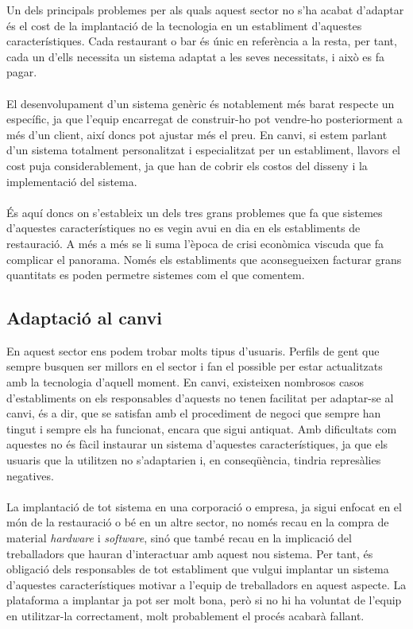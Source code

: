 Un dels principals problemes per als quals aquest sector no s'ha acabat d'adaptar és el cost de la implantació de la tecnologia en un establiment d'aquestes característiques. Cada restaurant o bar és únic en referència a la resta, per tant, cada un d'ells necessita un sistema adaptat a les seves necessitats, i això es fa pagar.
\\\\
El desenvolupament d'un sistema genèric és notablement més barat respecte un específic, ja que l'equip encarregat de construir-ho pot vendre-ho posteriorment a més d'un client, així doncs pot ajustar més el preu. En canvi, si estem parlant d'un sistema totalment personalitzat i especialitzat per un establiment, llavors el cost puja considerablement, ja que han de cobrir els costos del disseny i la implementació del sistema.
\\\\
És aquí doncs on s'estableix un dels tres grans problemes que fa que sistemes d'aquestes característiques no es vegin avui en dia en els establiments de restauració. A més a més se li suma l'època de crisi econòmica viscuda que fa complicar el panorama. Només els establiments que aconsegueixen facturar grans quantitats es poden permetre sistemes com el que comentem.

\subsection{Adaptació al canvi}

En aquest sector ens podem trobar molts tipus d'usuaris. Perfils de gent que sempre busquen ser millors en el sector i fan el possible per estar actualitzats amb la tecnologia d'aquell moment. 
En canvi, existeixen nombrosos casos d'establiments on els responsables d'aquests no tenen facilitat per adaptar-se al canvi, és a dir, que se satisfan amb el procediment de negoci que sempre han tingut i sempre els ha funcionat, encara que sigui antiquat. Amb dificultats com aquestes no és fàcil instaurar un sistema d'aquestes característiques, ja que els usuaris que la utilitzen no s'adaptarien i, en conseqüència, tindria represàlies negatives.
\\\\
La implantació de tot sistema en una corporació o empresa, ja sigui enfocat en el món de la restauració o bé en un altre sector, no només recau en la compra de material \textit{hardware} i \textit{software}, sinó que també recau en la implicació del treballadors que hauran d'interactuar amb aquest nou sistema. Per tant, és obligació dels responsables de tot establiment que vulgui implantar un sistema d'aquestes característiques motivar a l'equip de treballadors en aquest aspecte. La plataforma a implantar ja pot ser molt bona, però si no hi ha voluntat de l'equip en utilitzar-la correctament, molt probablement el procés acabarà fallant. 

